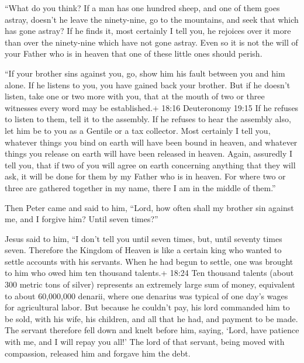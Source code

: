  ``What do you think? If a man has one hundred sheep, and
one of them goes astray, doesn't he leave the ninety-nine, go to the
mountains, and seek that which has gone astray?  If he
finds it, most certainly I tell you, he rejoices over it more than over
the ninety-nine which have not gone astray.  Even so it is
not the will of your Father who is in heaven that one of these little
ones should perish.

 ``If your brother sins against you, go, show him his fault
between you and him alone. If he listens to you, you have gained back
your brother.  But if he doesn't listen, take one or two
more with you, that at the mouth of two or three witnesses every word
may be established.+ 18:16 Deuteronomy 19:15  If he refuses
to listen to them, tell it to the assembly. If he refuses to hear the
assembly also, let him be to you as a Gentile or a tax collector.
 Most certainly I tell you, whatever things you bind on
earth will have been bound in heaven, and whatever things you release on
earth will have been released in heaven.  Again, assuredly
I tell you, that if two of you will agree on earth concerning anything
that they will ask, it will be done for them by my Father who is in
heaven.  For where two or three are gathered together in my
name, there I am in the middle of them.''

 Then Peter came and said to him, ``Lord, how often shall
my brother sin against me, and I forgive him? Until seven times?''

 Jesus said to him, ``I don't tell you until seven times,
but, until seventy times seven.  Therefore the Kingdom of
Heaven is like a certain king who wanted to settle accounts with his
servants.  When he had begun to settle, one was brought to
him who owed him ten thousand talents.+ 18:24 Ten thousand talents
(about 300 metric tons of silver) represents an extremely large sum of
money, equivalent to about 60,000,000 denarii, where one denarius was
typical of one day's wages for agricultural labor.  But
because he couldn't pay, his lord commanded him to be sold, with his
wife, his children, and all that he had, and payment to be made.
 The servant therefore fell down and knelt before him,
saying, `Lord, have patience with me, and I will repay you all!'
 The lord of that servant, being moved with compassion,
released him and forgave him the debt.

